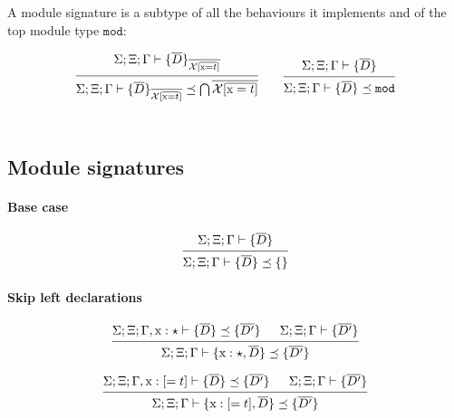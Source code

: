 \documentclass[12pt]{article}
\newcommand{\tx}{\text{\rm x}}
\newcommand{\BX}{\ensuremath{\mathcal{X}}}
\newcommand{\Gammatop}{\ensuremath{\Xi}}
\newcommand{\Gammabot}{\ensuremath{\Gamma}}
\renewcommand{\mod}{\texttt{mod}}
\begin{document}
A module signature is a subtype of all the behaviours it implements
and of the top module type $\mod$:

\[
    \begin{prooftree}
        \hypo{ \Sigma; \Gammatop; \Gammabot \vdash \{ \overline{D} \}_{\overline{\BX[\overline{\tx = t}]} }}
        \infer1{ \Sigma; \Gammatop; \Gammabot \vdash \{ \overline{D} \}_{\overline{\BX[\overline{\tx = t}]} } \preceq \bigcap \overline{\BX[\overline{\tx = t}]} }
    \end{prooftree}
    \qquad
    \begin{prooftree}
        \hypo{ \Sigma; \Gammatop; \Gammabot \vdash \{ \overline{D} \} }
        \infer1{ \Sigma; \Gammatop; \Gammabot \vdash \{ \overline{D} \} \preceq  \mod }
    \end{prooftree}
\] \\


\subsection{Module signatures}

\paragraph{Base case}

\[
    \begin{prooftree}
        \hypo{ \Sigma; \Gammatop; \Gammabot \vdash \{ \overline{D} \} }
        \infer1{ \Sigma; \Gammatop; \Gammabot \vdash \{ \overline{D} \} \preceq \{ \} }
    \end{prooftree}
\]

\paragraph{Skip left declarations}

\[
    \begin{prooftree}
        \hypo{ \Sigma; \Gammatop; \Gammabot, \tx : \star  \vdash \{ \overline{D} \} \preceq \{\overline{D'}\} }
        \hypo{ \Sigma; \Gammatop; \Gammabot  \vdash \{\overline{D'}\} }
        \infer2{ \Sigma; \Gammatop; \Gammabot \vdash \{ \tx : \star, \overline{D} \} \preceq \{ \overline{D'} \} }
    \end{prooftree}
\]

\[
    \begin{prooftree}
        \hypo{ \Sigma; \Gammatop; \Gammabot, \tx : [= t] \vdash \{ \overline{D}\} \preceq \{\overline{D'}\} }
        \hypo{  \Sigma; \Gammatop; \Gammabot  \vdash \{\overline{D'}\} }
        \infer2{ \Sigma; \Gammatop; \Gammabot \vdash \{ \tx : [= t], \overline{D} \} \preceq \{ \overline{D'} \} }
    \end{prooftree}
\]
\end{document}
